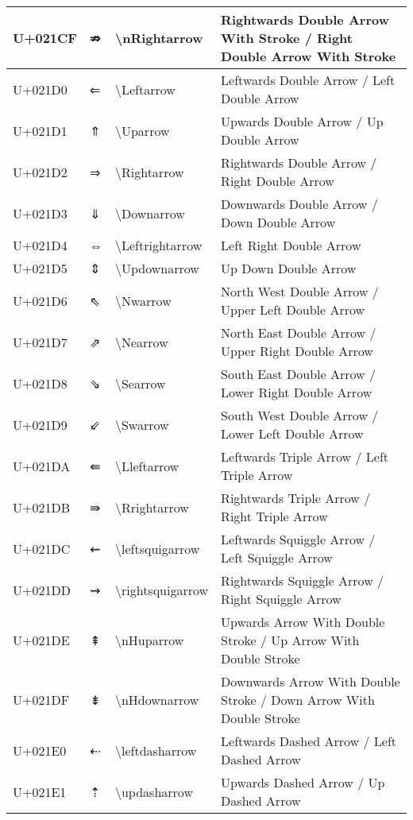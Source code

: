 \begin{table}[h]
\begin{tabulary}{\linewidth}{|L|L|L|L|}
\hline
U+021CF & ⇏ & {\textbackslash}nRightarrow & Rightwards Double Arrow With Stroke / Right Double Arrow With Stroke \\
\hline
U+021D0 & ⇐ & {\textbackslash}Leftarrow & Leftwards Double Arrow / Left Double Arrow \\
\hline
U+021D1 & ⇑ & {\textbackslash}Uparrow & Upwards Double Arrow / Up Double Arrow \\
\hline
U+021D2 & ⇒ & {\textbackslash}Rightarrow & Rightwards Double Arrow / Right Double Arrow \\
\hline
U+021D3 & ⇓ & {\textbackslash}Downarrow & Downwards Double Arrow / Down Double Arrow \\
\hline
U+021D4 & ⇔ & {\textbackslash}Leftrightarrow & Left Right Double Arrow \\
\hline
U+021D5 & ⇕ & {\textbackslash}Updownarrow & Up Down Double Arrow \\
\hline
U+021D6 & ⇖ & {\textbackslash}Nwarrow & North West Double Arrow / Upper Left Double Arrow \\
\hline
U+021D7 & ⇗ & {\textbackslash}Nearrow & North East Double Arrow / Upper Right Double Arrow \\
\hline
U+021D8 & ⇘ & {\textbackslash}Searrow & South East Double Arrow / Lower Right Double Arrow \\
\hline
U+021D9 & ⇙ & {\textbackslash}Swarrow & South West Double Arrow / Lower Left Double Arrow \\
\hline
U+021DA & ⇚ & {\textbackslash}Lleftarrow & Leftwards Triple Arrow / Left Triple Arrow \\
\hline
U+021DB & ⇛ & {\textbackslash}Rrightarrow & Rightwards Triple Arrow / Right Triple Arrow \\
\hline
U+021DC & ⇜ & {\textbackslash}leftsquigarrow & Leftwards Squiggle Arrow / Left Squiggle Arrow \\
\hline
U+021DD & ⇝ & {\textbackslash}rightsquigarrow & Rightwards Squiggle Arrow / Right Squiggle Arrow \\
\hline
U+021DE & ⇞ & {\textbackslash}nHuparrow & Upwards Arrow With Double Stroke / Up Arrow With Double Stroke \\
\hline
U+021DF & ⇟ & {\textbackslash}nHdownarrow & Downwards Arrow With Double Stroke / Down Arrow With Double Stroke \\
\hline
U+021E0 & ⇠ & {\textbackslash}leftdasharrow & Leftwards Dashed Arrow / Left Dashed Arrow \\
\hline
U+021E1 & ⇡ & {\textbackslash}updasharrow & Upwards Dashed Arrow / Up Dashed Arrow \\

\end{tabulary}
\end{table}
